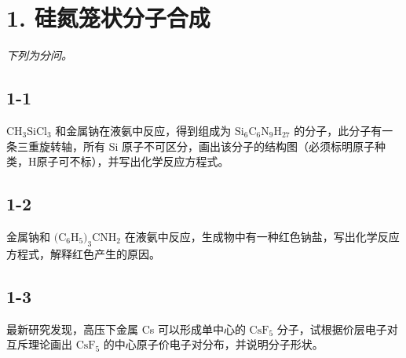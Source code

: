 \section*{1. 硅氮笼状分子合成}
\textit{下列为分问。}

\subsection*{1-1}
$\mathrm { C H _ { 3 } S i C l _ { 3 } }$ 和⾦属钠在液氨中反应，得到组成为 $\mathrm { S i _ { 6 } C _ { 6 } N _ { 9 } H _ { 2 7 } }$ 的分⼦，此分⼦有⼀条三重旋转轴，所有 Si 原⼦不可区分，画出该分⼦的结构图（必须标明原⼦种类，H原⼦可不标），并写出化学反应⽅程式。

\subsection*{1-2}
⾦属钠和 $( \mathrm { C _ { 6 } H _ { 5 } ) _ { 3 } C N H _ { 2 } }$ 在液氨中反应，⽣成物中有⼀种红⾊钠盐，写出化学反应⽅程式，解释红⾊产⽣的原因。

\subsection*{1-3}
最新研究发现，⾼压下⾦属 Cs 可以形成单中⼼的 $\mathrm { C s F _ { 5 } }$ 分⼦，试根据价层电⼦对互斥理论画出 $\mathrm { C s F _ { 5 } }$ 的中⼼原⼦价电⼦对分布，并说明分⼦形状。
